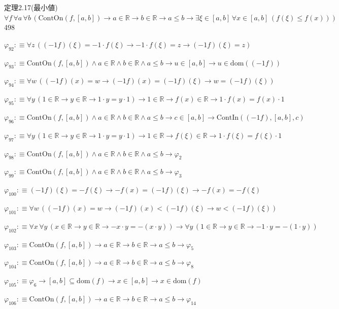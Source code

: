 \begin{fullproof}{定理2.17(最小値)}{$\forall f\,\forall a\,\forall b\,(\mathrm{ContOn}(f,[a,b]) \to a \in \mathbb{R} \to b \in \mathbb{R} \to a \leq b \to \exists \xi \in [a,b]\,\forall x \in [a,b]\,(f(\xi) \leq f(x)))$}{498}
\begin{abbrevlist}
\item $\varphi_{92} :\equiv \forall z\,((-1 f)(\xi) = -1 \cdot f(\xi) \to -1 \cdot f(\xi) = z \to (-1 f)(\xi) = z)$
\item $\varphi_{93} :\equiv \mathrm{ContOn}(f,[a,b]) \land a \in \mathbb{R} \land b \in \mathbb{R} \land a \leq b \to u \in [a,b] \to u \in \mathrm{dom}((-1 f))$
\item $\varphi_{94} :\equiv \forall w\,((-1 f)(x) = w \to (-1 f)(x) = (-1 f)(\xi) \to w = (-1 f)(\xi))$
\item $\varphi_{95} :\equiv \forall y\,(1 \in \mathbb{R} \to y \in \mathbb{R} \to 1 \cdot y = y \cdot 1) \to 1 \in \mathbb{R} \to f(x) \in \mathbb{R} \to 1 \cdot f(x) = f(x) \cdot 1$
\item $\varphi_{96} :\equiv \mathrm{ContOn}(f,[a,b]) \land a \in \mathbb{R} \land b \in \mathbb{R} \land a \leq b \to c \in [a,b] \to \mathrm{ContIn}((-1 f),[a,b],c)$
\item $\varphi_{97} :\equiv \forall y\,(1 \in \mathbb{R} \to y \in \mathbb{R} \to 1 \cdot y = y \cdot 1) \to 1 \in \mathbb{R} \to f(\xi) \in \mathbb{R} \to 1 \cdot f(\xi) = f(\xi) \cdot 1$
\item $\varphi_{98} :\equiv \mathrm{ContOn}(f,[a,b]) \land a \in \mathbb{R} \land b \in \mathbb{R} \land a \leq b \to \varphi_{2}$
\item $\varphi_{99} :\equiv \mathrm{ContOn}(f,[a,b]) \land a \in \mathbb{R} \land b \in \mathbb{R} \land a \leq b \to \varphi_{3}$
\item $\varphi_{100} :\equiv (-1 f)(\xi) = -f(\xi) \to -f(x) = (-1 f)(\xi) \to -f(x) = -f(\xi)$
\item $\varphi_{101} :\equiv \forall w\,((-1 f)(x) = w \to (-1 f)(x) < (-1 f)(\xi) \to w < (-1 f)(\xi))$
\item $\varphi_{102} :\equiv \forall x\,\forall y\,(x \in \mathbb{R} \to y \in \mathbb{R} \to -x \cdot y = -(x \cdot y)) \to \forall y\,(1 \in \mathbb{R} \to y \in \mathbb{R} \to -1 \cdot y = -(1 \cdot y))$
\item $\varphi_{103} :\equiv \mathrm{ContOn}(f,[a,b]) \to a \in \mathbb{R} \to b \in \mathbb{R} \to a \leq b \to \varphi_{5}$
\item $\varphi_{104} :\equiv \mathrm{ContOn}(f,[a,b]) \to a \in \mathbb{R} \to b \in \mathbb{R} \to a \leq b \to \varphi_{8}$
\item $\varphi_{105} :\equiv \varphi_{6} \to [a,b] \subseteq \mathrm{dom}(f) \to x \in [a,b] \to x \in \mathrm{dom}(f)$
\item $\varphi_{106} :\equiv \mathrm{ContOn}(f,[a,b]) \to a \in \mathbb{R} \to b \in \mathbb{R} \to a \leq b \to \varphi_{14}$

\end{abbrevlist}
\end{fullproof}
